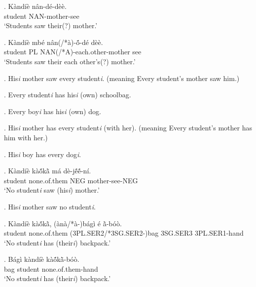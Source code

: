 \documentclass{assets/fieldnotes}
\begin{document}

\exg. K\`{a}nd\'{i}\`{e} n\^{a}n-d\'{e}-d\`{e}\`{e}. \\
student NAN-mother-see \\
`Students saw their(?) mother.' 


\exg.  K\`{a}nd\'{i}\`{e} mb\'{e} n\^{a}n(/*\`{a})-\textipa{\textltailn}ṍ-d\'{e} d\`{e}\`{e}. \\ 
student PL NAN(/*A)-each.other-mother see \\
`Students saw their each other's(?) mother.' 

\ex. His\textit{\scriptsize{i}} mother saw every student\textit{\scriptsize{i}}. (meaning Every student's mother saw him.)

\ex. Every student\textit{\scriptsize{i}} has his\textit{\scriptsize{i}} (own) schoolbag.

\ex. Every boy\textit{\scriptsize{i}} has his\textit{\scriptsize{i}} (own) dog.

\ex. His\textit{\scriptsize{i}} mother has every student\textit{\scriptsize{i}} (with her). (meaning Every student's mother has him with her.) 

\ex. His\textit{\scriptsize{i}} boy has every dog\textit{\scriptsize{i}}. 

\exg. K\`{a}nd\'{i}\`{e} k\`{a}ṍkã̀ m\'{a} d\`{e}-jẽ́ẽ́-n\'{i}. \\
student none.of.them NEG mother-see-NEG \\
`No student\textit{\scriptsize{i}} saw (his\textit{\scriptsize{i}}) mother.' 

\ex. His\textit{\scriptsize{i}} mother saw no student\textit{\scriptsize{i}}.

\exg. K\`{a}nd\'{i}\`{e} k\`{a}ṍkã̀, (\`{a}n\`{a}/*\`{a}-)b\'{a}g\`{i} \'{e} ã̀-b\'{o}\`{o}. \\
student none.of.them (3PL.SER2/*3SG.SER2-)bag 3SG.SER3 3PL.SER1-hand \\
`No student\textit{\scriptsize{i}} has (their\textit{\scriptsize{i}}) backpack.'

\exg. B\'{a}g\`{i} k\`{a}nd\'{i}\`{e} k\`{a}ṍkã̀-b\'{o}\`{o}. \\
bag student none.of.them-hand \\
`No student\textit{\scriptsize{i}} has (their\textit{\scriptsize{i}}) backpack.' 
\end{document}
